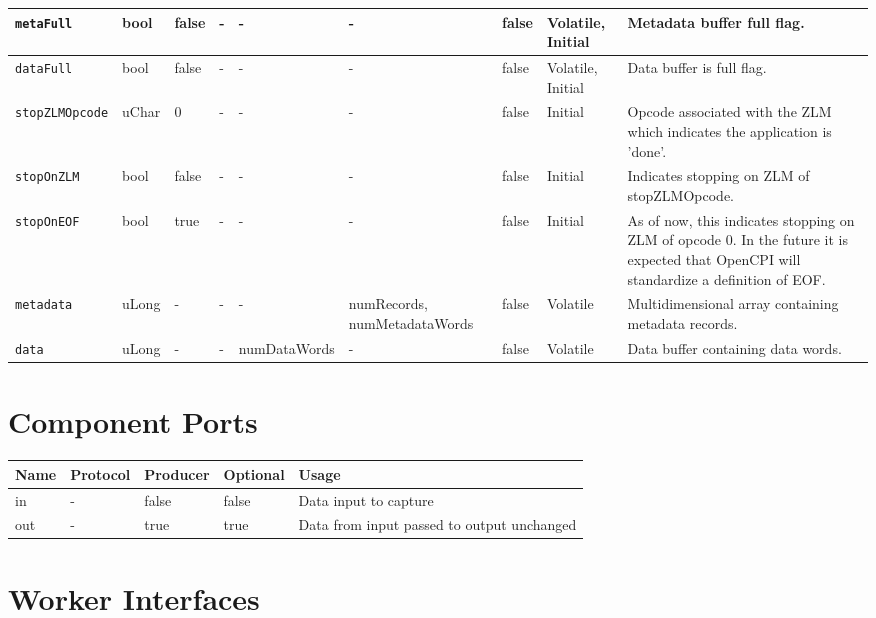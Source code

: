 \begin{landscape}
\begin{flushleft}
\begin{scriptsize}
\begin{tabular}{|p{2.5cm}|p{1cm}|p{1cm}|p{2cm}|p{2.5cm}|p{2cm}|p{1.5cm}|p{1.5cm}|p{5.5cm}|}
		\hline
		\verb+metaFull+ & bool & false & - & - & - & false & Volatile, Initial & Metadata buffer full flag.  \\
		\hline
		\verb+dataFull+ & bool & false & - & - & - & false & Volatile, Initial & Data buffer is full flag.  \\
		\hline
		\verb+stopZLMOpcode+ & uChar & 0 & - & - & - & false & Initial & Opcode associated with the ZLM which indicates the application is 'done'.\\
		\hline
		\verb+stopOnZLM+ & bool & false & - & - & - & false & Initial & Indicates stopping on ZLM of stopZLMOpcode.\\
		\hline
		\verb+stopOnEOF+ & bool & true & - & - & - & false & Initial & As of now, this indicates stopping on ZLM of opcode 0. In the future it is expected that OpenCPI will standardize a definition of EOF.\\
  		\hline
		\verb+metadata+ & uLong & - & - & - & numRecords, numMetadataWords & false & Volatile & Multidimensional array containing metadata records.\\
		\hline
		\verb+data+ & uLong & - & - & numDataWords & - & false & Volatile & Data buffer containing data words.\\
		\hline
	\end{tabular}
	\end{scriptsize}


\end{flushleft}


\section*{Component Ports}

	\begin{scriptsize}
		\begin{tabular}{|M{2cm}|M{2cm}|M{2cm}|M{3cm}|M{12cm}|}
			\hline
			Name & Protocol & Producer & Optional & Usage\\
			\hline
			in
			& -
			& false
			& false
			& Data input to capture \\
			\hline
			out
			& -
			& true
			& true
			& Data from input passed to output unchanged \\
			\hline
		\end{tabular}
		\end{scriptsize}
\section*{Worker Interfaces}

\end{landscape}

